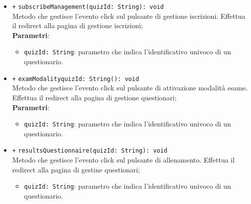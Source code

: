 \begin{itemize}
\begin{itemize}
\begin{itemize}
		\end{itemize}
		\item \texttt{+} \texttt{subscribeManagement(quizId: String): void} \\
		Metodo che gestisce l’evento click sul pulsante di gestione iscrizioni. Effettua il redirect alla pagina di gestione iscrizioni; \\
		\textbf{Parametri}:
		\begin{itemize}
			\item \texttt{quizId: String}: parametro che indica l'identificativo univoco di un questionario.
		\end{itemize}
		\item \texttt{+} \texttt{examModalityquizId: String(): void} \\Metodo che gestisce l’evento click sul pulsante di attivazione modalità esame. Effettua il redirect alla pagina di gestione questionari; \\
		\textbf{Parametri}:
		\begin{itemize}
			\item \texttt{quizId: String}: parametro che indica l'identificativo univoco di un questionario.
		\end{itemize}
		\item \texttt{+} \texttt{resultsQuestionnaire(quizId: String): void} \\
		Metodo che gestisce l’evento click sul pulsante di allenamento. Effettua il redirect alla pagina di gestine questionari;
		\begin{itemize}
			\item \texttt{quizId: String}: parametro che indica l'identificativo univoco di un questionario.
		\end{itemize}   
	\end{itemize}
\end{itemize}